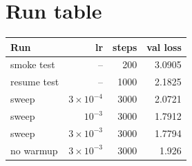 \documentclass[11pt,a4paper]{article}
\begin{document}
\section{Run table}
\begin{table}[h]\centering
\begin{tabular}{@{}lrrr@{}}\toprule
Run & lr & steps & val loss \\\midrule
smoke test & -- & 200 & 3.0905 \\
resume test & -- & 1000 & 2.1825 \\
sweep & $3\times10^{-4}$ & 3000 & 2.0721 \\
sweep & $10^{-3}$ & 3000 & 1.7912 \\
sweep & $3\times10^{-3}$ & 3000 & 1.7794 \\
no warmup & $3\times10^{-3}$ & 3000 & 1.926 \\\bottomrule
\end{tabular}\end{table}
\end{document}
